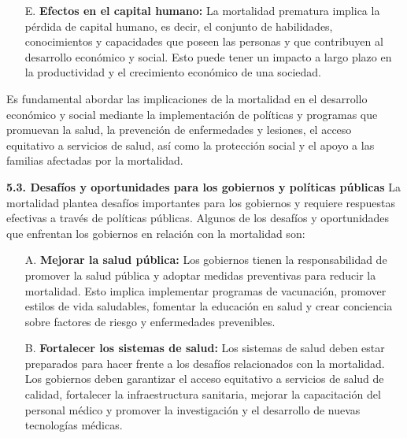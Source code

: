 \documentclass[8pt,a4paper]{beamer}
\begin{document}
{\begin{frame}{}
\setlength{\parskip}{3px}
\justifying
\begin{block}{}
\setlength{\parskip}{3px}
\justifying
\begin{enumerate}
\setlength{\parskip}{3px}
\justifying
\item[E.] \textbf{Efectos en el capital humano:} La mortalidad prematura implica la pérdida de capital humano, es decir, el conjunto de habilidades, conocimientos y capacidades que poseen las personas y que contribuyen al desarrollo económico y social. Esto puede tener un impacto a largo plazo en la productividad y el crecimiento económico de una sociedad.
\end{enumerate}
Es fundamental abordar las implicaciones de la mortalidad en el desarrollo económico y social mediante la implementación de políticas y programas que promuevan la salud, la prevención de enfermedades y lesiones, el acceso equitativo a servicios de salud, así como la protección social y el apoyo a las familias afectadas por la mortalidad.
\end{block}
\end{frame}


\begin{frame}{}
\setlength{\parskip}{3px}
\justifying
\begin{block}{\textbf{5.3. Desafíos y oportunidades para los gobiernos y políticas públicas}}
\setlength{\parskip}{3px}
\justifying
La mortalidad plantea desafíos importantes para los gobiernos y requiere respuestas efectivas a través de políticas públicas. Algunos de los desafíos y oportunidades que enfrentan los gobiernos en relación con la mortalidad son:

\begin{enumerate}
\setlength{\parskip}{3px}
\justifying
\item[A.] \textbf{Mejorar la salud pública:} Los gobiernos tienen la responsabilidad de promover la salud pública y adoptar medidas preventivas para reducir la mortalidad. Esto implica implementar programas de vacunación, promover estilos de vida saludables, fomentar la educación en salud y crear conciencia sobre factores de riesgo y enfermedades prevenibles.

\item[B.] \textbf{Fortalecer los sistemas de salud:} Los sistemas de salud deben estar preparados para hacer frente a los desafíos relacionados con la mortalidad. Los gobiernos deben garantizar el acceso equitativo a servicios de salud de calidad, fortalecer la infraestructura sanitaria, mejorar la capacitación del personal médico y promover la investigación y el desarrollo de nuevas tecnologías médicas.



\end{enumerate}
\end{block}
\end{frame}}
\end{document}
